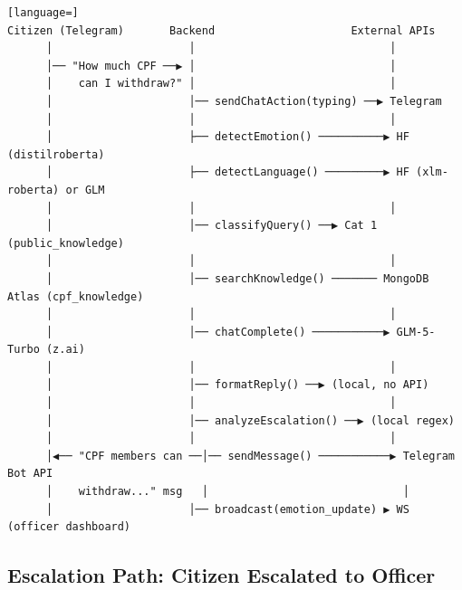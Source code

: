 \documentclass[12pt,a4paper]{article}
\begin{document}
\begin{lstlisting}[language=]
Citizen (Telegram)       Backend                     External APIs
      │                     │                              │
      │── "How much CPF ──▶ │                              │
      │    can I withdraw?" │                              │
      │                     │── sendChatAction(typing) ──▶ Telegram
      │                     │                              │
      │                     ├── detectEmotion() ──────────▶ HF (distilroberta)
      │                     ├── detectLanguage() ─────────▶ HF (xlm-roberta) or GLM
      │                     │                              │
      │                     │── classifyQuery() ──▶ Cat 1 (public_knowledge)
      │                     │                              │
      │                     │── searchKnowledge() ─────── MongoDB Atlas (cpf_knowledge)
      │                     │                              │
      │                     │── chatComplete() ───────────▶ GLM-5-Turbo (z.ai)
      │                     │                              │
      │                     │── formatReply() ──▶ (local, no API)
      │                     │                              │
      │                     │── analyzeEscalation() ──▶ (local regex)
      │                     │                              │
      │◀── "CPF members can ──│── sendMessage() ───────────▶ Telegram Bot API
      │    withdraw..." msg   │                              │
      │                     │── broadcast(emotion_update) ▶ WS (officer dashboard)
\end{lstlisting}

\subsection{Escalation Path: Citizen Escalated to Officer}
\end{document}
